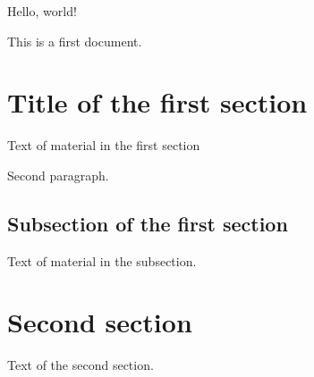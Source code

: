 \documentclass{article}
\begin{document}
Hello, world!

This is a first document.

\section{Title of the first section}

Text of material in the first section

Second paragraph.

\subsection{Subsection of the first section}

Text of material in the subsection.

\section{Second section}

Text of the second section.

\end{document}
